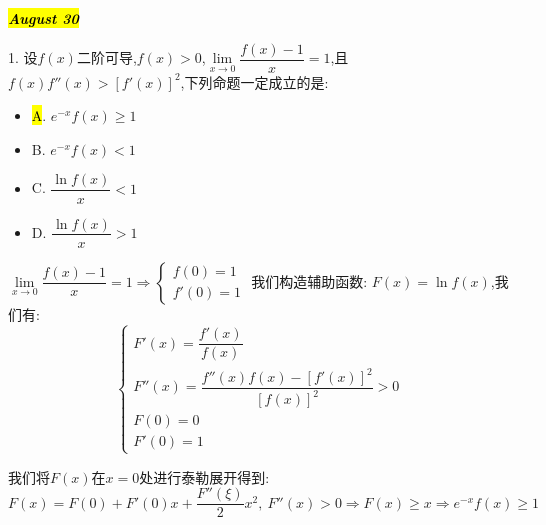 \hl{\textbf{\textit{August 30}}}

1. 设$f(x)$二阶可导,$f(x)>0$,$\lim\limits_{x\rightarrow 0}\dfrac{f(x)-1}{x}=1$,且$f(x)f''(x)>[f'(x)]^2$,下列命题一定成立的是:  
\begin{itemize}
	\item \hl{A}. $e^{-x}f(x)\geq 1$
	\item B. $e^{-x}f(x)<1$
	\item C. $\dfrac{\ln f(x)}{x}<1$
	\item D. $\dfrac{\ln f(x)}{x}>1$
\end{itemize}
\begin{solution}

	$\lim\limits_{x\rightarrow 0}\dfrac{f(x)-1}{x}=1\Rightarrow \left\lbrace
	\begin{array}{l}
		f(0)=1\\
		f'(0)=1
	\end{array}
	\right. $
	我们构造辅助函数:  $F(x)=\ln f(x)$,我们有:  
	$$\left\lbrace
	\begin{array}{l}
		F'(x)=\dfrac{f'(x)}{f(x)}\\
		F''(x)=\dfrac{f''(x)f(x)-[f'(x)]^2}{[f(x)]^2}>0\\
		F(0)=0\\
		F'(0)=1
	\end{array}
	\right. $$
	
	我们将$F(x)$在$x=0$处进行泰勒展开得到:  
	$$F(x)=F(0)+F'(0)x+\dfrac{F''(\xi)}{2}x^2,\ F''(x)>0\Rightarrow F(x)\geq x\Rightarrow e^{-x}f(x)\geq 1$$
\end{solution}

